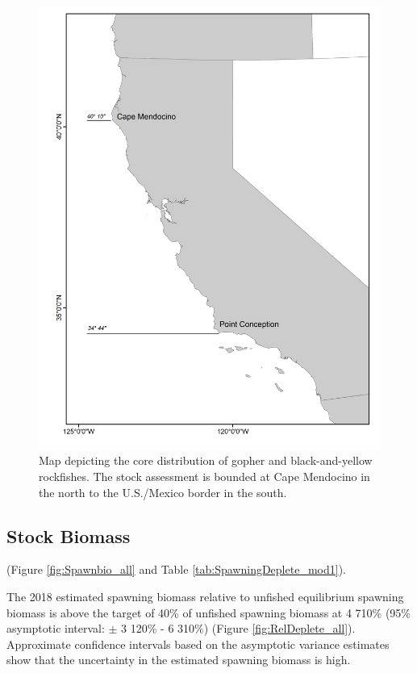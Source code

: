 \documentclass[12pt,]{article}
\begin{document}
\begin{figure}
\centering
\includegraphics{Figures/assess_region_map.png}
\caption{Map depicting the core distribution of gopher and
black-and-yellow rockfishes. The stock assessment is bounded at Cape
Mendocino in the north to the U.S./Mexico border in the south.
\label{fig:assess_region_map}}
\end{figure}

\FloatBarrier

\subsection*{Stock Biomass}\label{stock-biomass}

(Figure \ref{fig:Spawnbio_all} and Table
\ref{tab:SpawningDeplete_mod1}).

The 2018 estimated spawning biomass relative to unfished equilibrium
spawning biomass is above the target of 40\% of unfished spawning
biomass at 4 710\% (95\% asymptotic interval: \(\pm\) 3 120\% - 6 310\%)
(Figure \ref{fig:RelDeplete_all}). Approximate confidence intervals
based on the asymptotic variance estimates show that the uncertainty in
the estimated spawning biomass is high.
\end{document}
